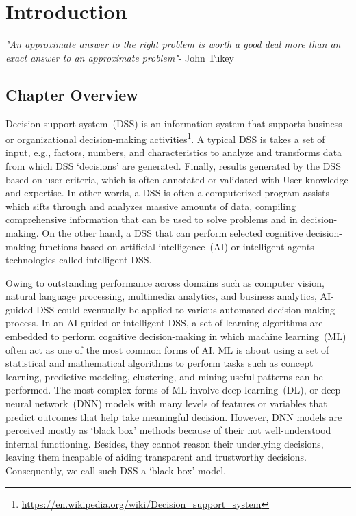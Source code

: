 \chapter{Introduction}
\label{chapter:introduction}
\textit{"An approximate answer to the right problem is worth a good deal more than an exact answer to an approximate problem"}- John Tukey

\section{Chapter Overview}
\hspace*{3.5mm} Decision support system~(DSS) is an information system that supports business or organizational decision-making activities\footnote{\url{https://en.wikipedia.org/wiki/Decision_support_system}}. A typical DSS is takes a set of input, e.g., factors, numbers, and characteristics to analyze and transforms data from which DSS `decisions' are generated. Finally, results generated by the DSS based on user criteria, which is often annotated or validated with User knowledge and expertise. In other words, a DSS is  often a computerized program assists which sifts through and analyzes massive amounts of data, compiling comprehensive information that can be used to solve problems and in decision-making. On the other hand, a DSS that can perform selected cognitive decision-making functions based on artificial intelligence~(AI) or intelligent agents technologies called intelligent DSS. 

\hspace*{3.5mm} Owing to outstanding performance across domains such as computer vision, natural language processing, multimedia analytics, and business analytics, AI-guided DSS could eventually be applied to various automated decision-making process. In an AI-guided or intelligent DSS, a set of learning algorithms are embedded to perform cognitive decision-making in which machine learning~(ML) often act as one of the most common forms of AI. ML is about using a set of statistical and mathematical algorithms to perform tasks such as concept learning, predictive modeling, clustering, and mining useful patterns can be performed. The most complex forms of ML involve deep learning~(DL), or deep neural network~(DNN) models with many levels of features or variables that predict outcomes that help take meaningful decision. However, DNN models are perceived mostly as `black box' methods because of their not well-understood internal functioning. Besides, they cannot reason their underlying decisions, leaving them incapable of aiding transparent and trustworthy decisions. Consequently, we call such DSS a `black box' model. 

